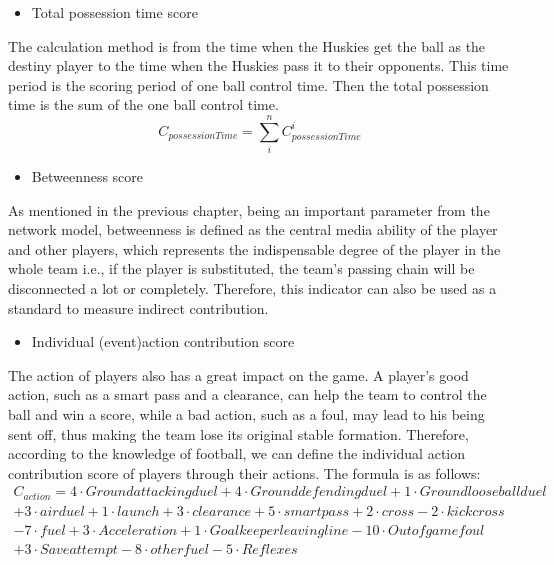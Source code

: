 \documentclass{mcmthesis}
\begin{document}
{\begin{itemize}
\item Total possession time score
\end{itemize}
The calculation method is from the time when the Huskies get the ball as the destiny player to the time when the Huskies pass it to their opponents. This time period is the scoring period of one ball control time. Then the total possession time is the sum of the one ball control time.
\begin{equation}
C_{possessionTime }=\sum\limits_{i}^{n}C_{ possessionTime}^{i}
\end{equation}

\begin{itemize}
\item Betweenness score
\end{itemize}
As mentioned in the previous chapter, being an important parameter from the network model, betweenness is defined as the central media ability of the player and other players, which represents the indispensable degree of the player in the whole team i.e., if the player is substituted, the team's passing chain will be disconnected a lot or completely. Therefore, this indicator can also be used as a standard to measure indirect contribution.

\begin{itemize}
\item Individual (event)action contribution score
\end{itemize}
The action of players also has a great impact on the game. A player's good action, such as a smart pass and a clearance, can help the team to control the ball and win a score, while a bad action, such as a foul, may lead to his being sent off, thus making the team lose its original stable formation. Therefore, according to the knowledge of football, we can define the individual action contribution score of players through their actions. The formula is as follows:
\begin{equation}
\begin{array}{lr}C_{action}= 4 \cdot Ground attacking duel  + 4 \cdot Ground defending duel +1\cdot Ground loose ball duel\\
+3\cdot air duel +1\cdot launch +3\cdot clearance +5\cdot smart pass +2\cdot cross -2\cdot kick cross
\\ -7\cdot fuel+3\cdot Acceleration
+1\cdot Goalkeeper leaving line -10\cdot Out of game foul\\ +3\cdot Save attempt -8\cdot other fuel -5\cdot Reflexes
\end{array}
\end{equation}


}
\end{document}
